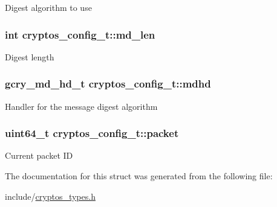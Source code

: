 \label{structcryptos__config__t_ad9bab3292aaefb4655a76ba03bb4e647}
Digest algorithm to use \hypertarget{structcryptos__config__t_accebe1ccacfcc0e531c012ad4dfa9ff7}{
\subsubsection[{md\_\-len}]{\setlength{\rightskip}{0pt plus 5cm}int {\bf cryptos\_\-config\_\-t::md\_\-len}}}
\label{structcryptos__config__t_accebe1ccacfcc0e531c012ad4dfa9ff7}
Digest length \hypertarget{structcryptos__config__t_ade08a42531e6824fd61ef4698d0c851c}{
\subsubsection[{mdhd}]{\setlength{\rightskip}{0pt plus 5cm}gcry\_\-md\_\-hd\_\-t {\bf cryptos\_\-config\_\-t::mdhd}}}
\label{structcryptos__config__t_ade08a42531e6824fd61ef4698d0c851c}
Handler for the message digest algorithm \hypertarget{structcryptos__config__t_ad027dbc31d02c462e5c701e9f407c092}{
\subsubsection[{packet}]{\setlength{\rightskip}{0pt plus 5cm}uint64\_\-t {\bf cryptos\_\-config\_\-t::packet}}}
\label{structcryptos__config__t_ad027dbc31d02c462e5c701e9f407c092}
Current packet ID 

The documentation for this struct was generated from the following file:\begin{DoxyCompactItemize}
\item 
include/\hyperlink{cryptos__types_8h}{cryptos\_\-types.h}\end{DoxyCompactItemize}
